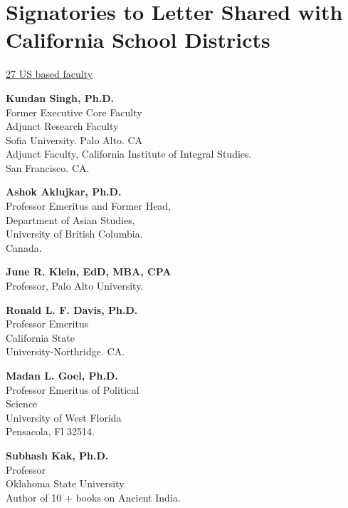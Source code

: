 \chapter{Signatories to Letter Shared with California School Districts}

\centerline{\underline{27 US based faculty}} 

\begin{multicols}{2}
\begin{trivlist}
\itemsep=10pt
\item \textbf{Kundan Singh, Ph.D.}\\ 
Former Executive Core Faculty\\
Adjunct Research Faculty\\
Sofia University. Palo Alto. CA\\
Adjunct Faculty, California Institute of Integral Studies.\\ 
San Francisco. CA. 

\item \textbf{Ashok Aklujkar, Ph.D.}\\ 
Professor Emeritus and Former Head,\\ 
Department of Asian Studies,\\ 
University of British Columbia.\\ 
Canada.

\item \textbf{June R. Klein, EdD, MBA, CPA}\\ 
Professor, Palo Alto University.


\item \textbf{Ronald L. F. Davis, Ph.D.}\\ 
Professor Emeritus\\ 
California State\\ 
University-Northridge. CA.

\item \textbf{Madan L. Goel, Ph.D.}\\ 
Professor Emeritus of Political\\ Science\\
University of West Florida\\
Pensacola, Fl 32514.

\item \textbf{Subhash Kak, Ph.D.}\\ 
Professor\\
Oklahoma State University\\
Author of 10 + books on Ancient India.\\


\end{trivlist}
\end{multicols}
